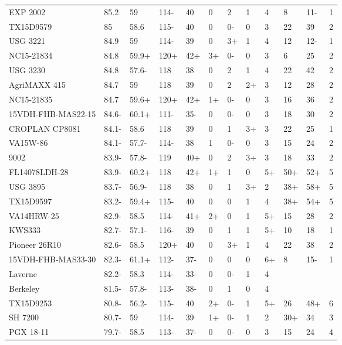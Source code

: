 \documentclass[12pt, letterpaper]{article}
\begin{document}
\begin{landscape}
\begin{ThreePartTable}
\begin{longtable}{llllllllllll}
  EXP 2002 & 85.2 & 59 & 114- & 40 & 0 & 2 & 1 & 4 & 8 & 11- & 1 \\ 
  TX15D9579 & 85 & 58.6 & 115- & 40 & 0 & 0- & 0 & 3 & 22 & 39 & 2 \\ 
  USG 3221 & 84.9 & 59 & 114- & 39 & 0 & 3+ & 1 & 4 & 12 & 12- & 1 \\ 
  NC15-21834 & 84.8 & 59.9+ & 120+ & 42+ & 3+ & 0- & 0 & 3 & 6 & 25 & 2 \\ 
  USG 3230 & 84.8 & 57.6- & 118 & 38 & 0 & 2 & 1 & 4 & 22 & 42 & 2 \\ 
  AgriMAXX 415 & 84.7 & 59 & 118 & 39 & 0 & 2 & 2+ & 3 & 12 & 28 & 2 \\ 
  NC15-21835 & 84.7 & 59.6+ & 120+ & 42+ & 1+ & 0- & 0 & 3 & 16 & 36 & 2 \\ 
  15VDH-FHB-MAS22-15 & 84.6- & 60.1+ & 111- & 35- & 0 & 0- & 0 & 3 & 18 & 30 & 2 \\ 
  CROPLAN CP8081 & 84.1- & 58.6 & 118 & 39 & 0 & 1 & 3+ & 3 & 22 & 25 & 1 \\ 
  VA15W-86 & 84.1- & 57.7- & 114- & 38 & 1 & 0- & 0 & 3 & 15 & 24 & 2 \\ 
  9002 & 83.9- & 57.8- & 119 & 40+ & 0 & 2 & 3+ & 3 & 18 & 33 & 2 \\ 
  FL14078LDH-28 & 83.9- & 60.2+ & 118 & 42+ & 1+ & 1 & 0 & 5+ & 50+ & 52+ & 5 \\ 
  USG 3895 & 83.7- & 56.9- & 118 & 38 & 0 & 1 & 3+ & 2 & 38+ & 58+ & 5 \\ 
  TX15D9597 & 83.2- & 59.4+ & 115- & 40 & 0 & 0 & 1 & 4 & 38+ & 54+ & 5 \\ 
  VA14HRW-25 & 82.9- & 58.5 & 114- & 41+ & 2+ & 0 & 1 & 5+ & 15 & 28 & 2 \\ 
  KWS333 & 82.7- & 57.1- & 116- & 39 & 0 & 1 & 1 & 5+ & 10 & 18 & 1 \\ 
  Pioneer 26R10 & 82.6- & 58.5 & 120+ & 40 & 0 & 3+ & 1 & 4 & 22 & 38 & 2 \\ 
  15VDH-FHB-MAS33-30 & 82.3- & 61.1+ & 112- & 37- & 0 & 0 & 0 & 6+ & 8 & 15- & 1 \\ 
  Laverne & 82.2- & 58.3 & 114- & 33- & 0 & 0- & 1 & 4 &  &  &  \\ 
  Berkeley & 81.5- & 57.8- & 113- & 38- & 0 & 1 & 0 & 4 &  &  &  \\ 
  TX15D9253 & 80.8- & 56.2- & 115- & 40 & 2+ & 0- & 1 & 5+ & 26 & 48+ & 6 \\ 
  SH 7200 & 80.7- & 59 & 114- & 39 & 1+ & 0- & 1 & 2 & 30+ & 34 & 3 \\ 
  PGX 18-11 & 79.7- & 58.5 & 113- & 37- & 0 & 0- & 0 & 3 & 15 & 24 & 4 \\ 

\end{longtable}
\end{ThreePartTable}
\end{landscape}
\end{document}

